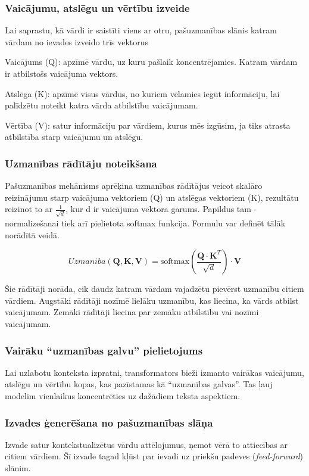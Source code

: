 \subsubsection{Vaicājumu, atslēgu un vērtību izveide}
Lai saprastu, kā vārdi ir saistīti viens ar otru, pašuzmanības slānis katram vārdam no ievades izveido trīs vektorus

Vaicājums (Q): apzīmē vārdu, uz kuru pašlaik koncentrējamies. Katram vārdam ir atbilstošs vaicājuma vektors.

Atslēga (K): apzīmē visus vārdus, no kuriem vēlamies iegūt informāciju, lai palīdzētu noteikt katra vārda atbilstību vaicājumam.

Vērtība (V): satur informāciju par vārdiem, kurus mēs izgūsim, ja tiks atrasta atbilstība starp vaicājumu un atslēgu.

\subsubsection{Uzmanības rādītāju noteikšana}

Pašuzmanības mehānisms aprēķina uzmanības rādītājus veicot skalāro reizinājumu starp vaicājuma vektoriem (Q) un atslēgas vektoriem (K), rezultātu reizinot to ar \(\frac{1}{\sqrt{d}}\), kur d ir vaicājuma vektora garums. Papildus tam - normalizešanai tiek arī pielietota softmax funkcija. Formulu var definēt tālāk norādītā veidā.

\begin{equation}
Uzmaniba(\mathbf{Q}, \mathbf{K}, \mathbf{V}) = \text{softmax}\left(\frac{\mathbf{Q} \cdot \mathbf{K}^T}{\sqrt{d}}\right) \cdot \mathbf{V}
\end{equation}

Šie rādītāji norāda, cik daudz katram vārdam vajadzētu pievērst uzmanību citiem vārdiem. Augstāki rādītāji nozīmē lielāku uzmanību, kas liecina, ka vārds atbilst vaicājumam. Zemāki rādītāji liecina par zemāku atbilstību vai nozīmi vaicājumam. 

\subsubsection{Vairāku “uzmanības galvu” pielietojums}

Lai uzlabotu konteksta izpratni, transformators bieži izmanto vairākas vaicājumu, atslēgu un vērtību kopas, kas pazīstamas kā “uzmanības galvas”. Tas ļauj modelim vienlaikus koncentrēties uz dažādiem teksta aspektiem.

\subsubsection{Izvades ģenerēšana no pašuzmanības slāņa}
Izvade satur kontekstualizētus vārdu attēlojumus, ņemot vērā to attiecības ar citiem vārdiem. Šī izvade tagad kļūst par ievadi uz priekšu padeves (\textit{feed-forward}) slānim.

